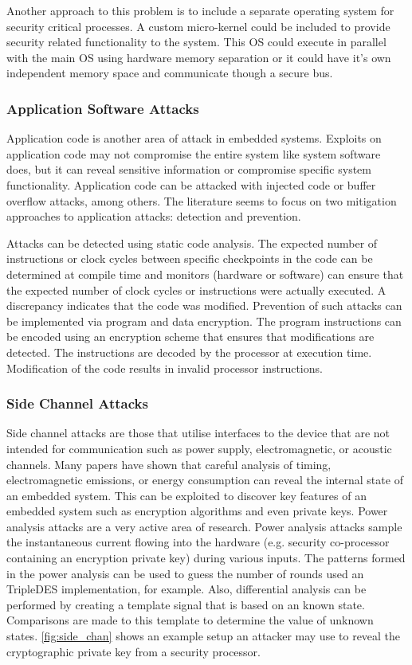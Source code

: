 \documentclass[final,conference,11pt]{IEEEtran}
\begin{document}
Another approach to this problem is to include a separate operating system for security critical processes.  A custom micro-kernel could be included to provide security related functionality to the system.  This OS could execute in parallel with the main OS using hardware memory separation or it could have it's own independent memory space and communicate though a secure bus.\cite{novelOS}

\subsubsection{Application Software Attacks}

Application code is another area of attack in embedded systems.  Exploits on application code may not compromise the entire system like system software does, but it can reveal sensitive information or compromise specific system functionality.  Application code can be attacked with injected code or buffer overflow attacks, among others.  The literature seems to focus on two mitigation approaches to application attacks: detection and prevention.  

Attacks can be detected using static code analysis.  The expected number of instructions or clock cycles between specific checkpoints in the code can be determined at compile time and monitors (hardware or software) can ensure that the expected number of clock cycles or instructions were actually executed.  A discrepancy indicates that the code was modified.  Prevention of such attacks can be implemented via program and data encryption.  The program instructions can be encoded using an encryption scheme that ensures that modifications are detected.  The instructions are decoded by the processor at execution time.  Modification of the code results in invalid processor instructions. \cite{compiler-hardware} \cite{architectural-frameworks}

\subsubsection{Side Channel Attacks}
Side channel attacks are those that utilise interfaces to the device that are not intended for communication such as power supply, electromagnetic, or acoustic channels.  Many papers have shown that careful analysis of timing, electromagnetic emissions, or energy consumption can reveal the internal state of an embedded system. \cite{papers??} This can be exploited to discover key features of an embedded system such as encryption algorithms and even private keys.  Power analysis attacks are a very active area of research.  Power analysis attacks sample the instantaneous current flowing into the hardware (e.g. security co-processor containing an encryption private key) during various inputs.  The patterns formed in the power analysis can be used to guess the number of rounds used an TripleDES implementation, for example.  Also, differential analysis can be performed by creating a template signal that is based on an known state.  Comparisons are made to this template to determine the value of unknown states.  \figurename \ref{fig:side_chan} shows an example setup an attacker may use to reveal the cryptographic private key from a security processor.
\end{document}

